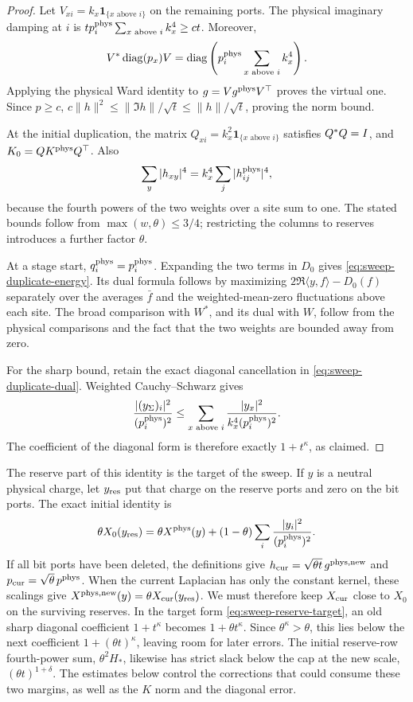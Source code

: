 \begin{proof}
Let $V_{xi}=k_x\mathbf1_{\{x\text{ above }i\}}$ on the remaining
ports. The physical imaginary damping at $i$ is
$t p_i^{\rm phys}\sum_{x\text{ above }i}k_x^4\ge ct$.
Moreover,
\[
 V^*\operatorname{diag}(p_x)V
 =\operatorname{diag}\left(p_i^{\rm phys}
                  \sum_{x\text{ above }i}k_x^4\right).
\]
Applying the physical Ward identity to $g=Vg^{\rm phys}V^\top$
proves the virtual one. Since $p\ge c$,
$c\|h\|^2\le\|\Im h\|/\sqrt t\le\|h\|/\sqrt t$, proving the norm
bound.

At the initial duplication, the matrix
$Q_{xi}=k_x^2\mathbf1_{\{x\text{ above }i\}}$ satisfies $Q^*Q=I$,
and $K_0=QK^{\rm phys}Q^\top$. Also
\[
 \sum_y|h_{xy}|^4
 =k_x^4\sum_j|h^{\rm phys}_{ij}|^4,
\]
because the fourth powers of the two weights over a site sum to one.
The stated bounds follow from $\max(w,\theta)\le3/4$; restricting the
columns to reserves introduces a further factor $\theta$.

At a stage start, $q_i^{\rm phys}=p_i^{\rm phys}$. Expanding the two
terms in $D_0$ gives \eqref{eq:sweep-duplicate-energy}. Its dual
formula follows by maximizing
$2\Re\langle y,f\rangle-D_0(f)$ separately over the averages
$\bar f$ and the weighted-mean-zero fluctuations above each site.
The broad comparison with $W^*$, and its dual with $W$, follow from
the physical comparisons and the fact that the two weights are bounded
away from zero.

For the sharp bound, retain the exact diagonal cancellation in
\eqref{eq:sweep-duplicate-dual}. Weighted Cauchy--Schwarz gives
\[
 \frac{|(y_\Sigma)_i|^2}{(p_i^{\rm phys})^2}
 \le\sum_{x\text{ above }i}
       \frac{|y_x|^2}{k_x^4(p_i^{\rm phys})^2}.
\]
The coefficient of the diagonal form is therefore exactly
$1+t^\kappa$, as claimed.
\end{proof}

The reserve part of this identity is the target of the sweep. If $y$ is a
neutral physical charge, let $y_{\rm res}$ put that charge on the reserve
ports and zero on the bit ports. The exact initial identity is
\begin{equation}\label{eq:sweep-reserve-target}
 \theta X_0(y_{\rm res})
 =\theta X^{\rm phys}(y)
   +(1-\theta)\sum_i\frac{|y_i|^2}{(p_i^{\rm phys})^2}.
\end{equation}
If all bit ports have been deleted, the definitions give
$h_{\rm cur}=\sqrt{\theta t}\,g^{\rm phys,new}$ and
$p_{\rm cur}=\sqrt\theta\,p^{\rm phys}$. When the current Laplacian has
only the constant kernel, these scalings give
$X^{\rm phys,new}(y)=\theta X_{\rm cur}(y_{\rm res})$.
We must therefore keep $X_{\rm cur}$ close to $X_0$ on the surviving
reserves. In the target form \eqref{eq:sweep-reserve-target}, an old sharp
diagonal coefficient $1+t^\kappa$ becomes $1+\theta t^\kappa$.
Since $\theta^\kappa>\theta$, this lies below the next coefficient
$1+(\theta t)^\kappa$, leaving room for later errors. The initial
reserve-row fourth-power sum,
$\theta^2H_*$, likewise has strict slack below the cap at the new scale,
$(\theta t)^{1+\delta}$. The estimates below control the corrections
that could consume these two margins, as well as the $K$ norm and the
diagonal error.


